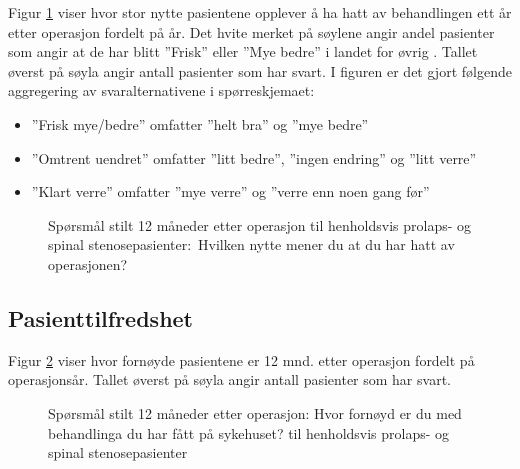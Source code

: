 \documentclass [norsk,a4paper,twoside]{article}\usepackage[]{graphicx}\usepackage[]{color}
\begin{document}
Figur \ref{fig:Nytte} viser hvor stor nytte pasientene opplever å ha hatt av behandlingen ett år etter operasjon fordelt på år. Det hvite merket på søylene angir andel pasienter som angir at de har blitt ''Frisk'' eller ''Mye bedre'' i landet for øvrig . Tallet øverst på søyla angir antall pasienter som har svart. 
I figuren er det gjort følgende aggregering av svaralternativene i spørreskjemaet:
\begin{itemize}
\item ''Frisk mye/bedre'' omfatter ''helt bra'' og ''mye bedre'' 
\item ''Omtrent uendret'' omfatter ''litt bedre'', ''ingen endring'' og ''litt verre'' 
\item ''Klart verre'' omfatter ''mye verre'' og ''verre enn noen gang før''
\end{itemize}



\begin{figure}[h] 
\begin{center}
\end{center}
\caption{Spørsmål stilt 12 måneder etter operasjon til henholdsvis prolaps- og spinal stenosepasienter$:$ Hvilken nytte mener du at du har hatt av operasjonen?}
\label{fig:Nytte}
\end{figure}




\subsection{Pasienttilfredshet}

Figur \ref{fig:Fornoyd} viser hvor fornøyde pasientene er 12 mnd. 
etter operasjon fordelt på operasjonsår. Tallet øverst på søyla angir antall pasienter som har svart. 




\begin{figure}[h] 
\begin{center}
\end{center}
\caption{Spørsmål stilt 12 måneder etter operasjon: Hvor fornøyd er du med behandlinga du har fått på sykehuset? til henholdsvis prolaps- og spinal stenosepasienter}
\label{fig:Fornoyd}
\end{figure}
\end{document}
